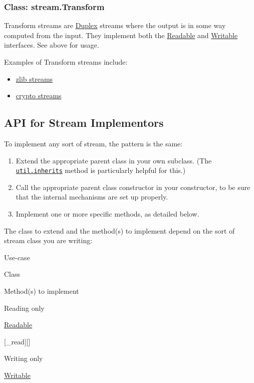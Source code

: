 \subsubsection{Class: stream.Transform}

Transform streams are \hyperref[stream\_class\_stream\_duplex]{Duplex}
streams where the output is in some way computed from the input. They
implement both the \hyperref[stream\_class\_stream\_readable]{Readable}
and \hyperref[stream\_class\_stream\_writable]{Writable} interfaces. See
above for usage.

Examples of Transform streams include:

\begin{itemize}
\item
  \href{zlib.html}{zlib streams}
\item
  \href{crypto.html}{crypto streams}
\end{itemize}

\subsection{API for Stream Implementors}

To implement any sort of stream, the pattern is the same:

\begin{enumerate}[1.]
\item
  Extend the appropriate parent class in your own subclass. (The
  \href{util.html\#util\_util\_inherits\_constructor\_superconstructor}{\texttt{util.inherits}}
  method is particularly helpful for this.)
\item
  Call the appropriate parent class constructor in your constructor, to
  be sure that the internal mechanisms are set up properly.
\item
  Implement one or more specific methods, as detailed below.
\end{enumerate}

The class to extend and the method(s) to implement depend on the sort of
stream class you are writing:

Use-case

Class

Method(s) to implement

Reading only

\hyperref[stream\_class\_stream\_readable\_1]{Readable}

{[}\_read{]}{[}{]}

Writing only

\hyperref[stream\_class\_stream\_writable\_1]{Writable}

